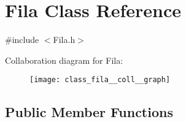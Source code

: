 \hypertarget{class_fila}{\section{Fila Class Reference}
\label{class_fila}
}


{\ttfamily \#include $<$Fila.\+h$>$}



Collaboration diagram for Fila\+:
\nopagebreak
\begin{figure}[H]
\begin{center}
\leavevmode
\texttt{[image: class\_fila\_\_coll\_\_graph]}
\end{center}
\end{figure}
\subsection*{Public Member Functions}
